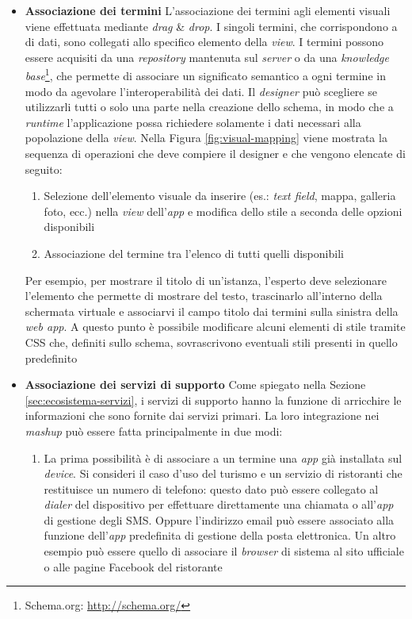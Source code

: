 \begin{itemize}
	\item \textbf{Associazione dei termini} 
	L'associazione dei termini agli elementi visuali viene effettuata mediante \emph{drag} \& \emph{drop}. I singoli termini, che corrispondono a  di dati, sono collegati allo specifico elemento della \emph{view}. 
	I termini possono essere acquisiti da una \emph{repository} mantenuta sul \emph{server} o da una \emph{knowledge base}\footnote{Schema.org: \url{http://schema.org/}}, che permette di associare un significato semantico a ogni termine in modo da agevolare l'interoperabilità dei dati. Il \emph{designer} può scegliere se utilizzarli tutti o solo una parte nella creazione dello schema, in modo che a \emph{runtime} l'applicazione possa richiedere solamente i dati necessari alla popolazione della \emph{view}.
	Nella Figura \ref{fig:visual-mapping} viene mostrata la sequenza di operazioni che deve compiere il designer e che vengono elencate di seguito:
	\begin{enumerate}
		\item
		Selezione dell'elemento visuale da inserire (es.: \emph{text field}, mappa, galleria foto, ecc.) nella \emph{view} dell'\emph{app} e modifica dello stile a seconda delle opzioni disponibili
		\item
		Associazione del termine tra l'elenco di tutti quelli disponibili
	\end{enumerate}
	Per esempio, per mostrare il titolo di un'istanza, l'esperto deve selezionare l'elemento che permette di mostrare del testo, trascinarlo all'interno della schermata virtuale e associarvi il campo titolo dai termini sulla sinistra della \emph{web app}. A questo punto è possibile modificare alcuni elementi di stile tramite CSS che, definiti sullo schema, sovrascrivono eventuali stili presenti in quello predefinito
	\item \textbf{Associazione dei servizi di supporto}
	Come spiegato nella Sezione \ref{sec:ecosistema-servizi}, i servizi di supporto hanno la funzione di arricchire le informazioni che sono fornite dai servizi primari. La loro integrazione nei \emph{mashup} può essere fatta principalmente in due modi:
	\begin{enumerate}
		\item
		La prima possibilità è di associare a un termine una \emph{app} già installata sul \emph{device}. Si consideri il caso d'uso del turismo e un servizio di ristoranti che restituisce un numero di telefono: questo dato può essere collegato al \emph{dialer} del dispositivo per effettuare direttamente una chiamata o all'\emph{app} di gestione degli SMS. Oppure l'indirizzo email può essere associato alla funzione  dell'\emph{app} predefinita di gestione della posta elettronica. Un altro esempio può essere quello di associare il \emph{browser} di sistema al sito ufficiale o alle pagine Facebook del ristorante

\end{enumerate}
\end{itemize}
